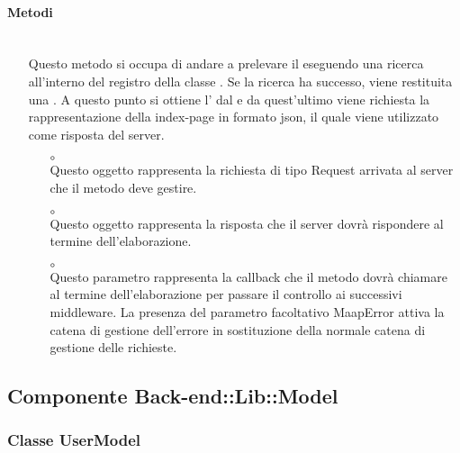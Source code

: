\paragraph*{Metodi}
\begin{itemize}
\item[]  \\ Questo metodo si occupa di andare a prelevare il  eseguendo una ricerca all'interno del registro della classe . Se la ricerca ha successo, viene restituita una . A questo punto si ottiene l'  dal  e da quest'ultimo viene richiesta la rappresentazione della index-page in formato json, il quale viene utilizzato come risposta del server.
\begin{itemize}\addtolength{\itemsep}{-0.5\baselineskip}
\item[$\circ$]  \\ Questo oggetto rappresenta la richiesta di tipo Request arrivata al server che il metodo deve gestire.
\item[$\circ$]  \\ Questo oggetto rappresenta la risposta che il server dovrà rispondere al termine dell'elaborazione.
\item[$\circ$]  \\ Questo parametro rappresenta la callback che il metodo dovrà chiamare al termine dell'elaborazione per passare il controllo ai successivi middleware. La presenza del parametro facoltativo MaapError attiva la catena di gestione dell'errore in sostituzione della normale catena di gestione delle richieste.
\end{itemize}
\end{itemize}

\subsection{Componente Back-end::Lib::Model}

\subsubsection{Classe UserModel}

